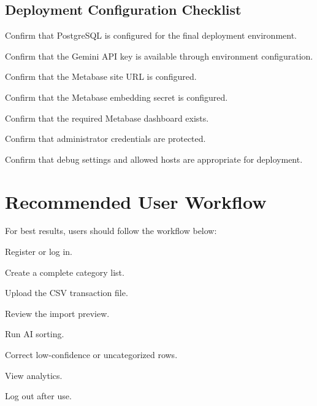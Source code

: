 \subsection{Deployment Configuration Checklist}
\begin{normalsteps}
	\item Confirm that PostgreSQL is configured for the final deployment environment.
	\item Confirm that the Gemini API key is available through environment configuration.
	\item Confirm that the Metabase site URL is configured.
	\item Confirm that the Metabase embedding secret is configured.
	\item Confirm that the required Metabase dashboard exists.
	\item Confirm that administrator credentials are protected.
	\item Confirm that debug settings and allowed hosts are appropriate for deployment.
\end{normalsteps}

\section{Recommended User Workflow}
For best results, users should follow the workflow below:
\begin{normalsteps}
	\item Register or log in.
	\item Create a complete category list.
	\item Upload the CSV transaction file.
	\item Review the import preview.
	\item Run AI sorting.
	\item Correct low-confidence or uncategorized rows.
	\item View analytics.
	\item Log out after use.
\end{normalsteps}

